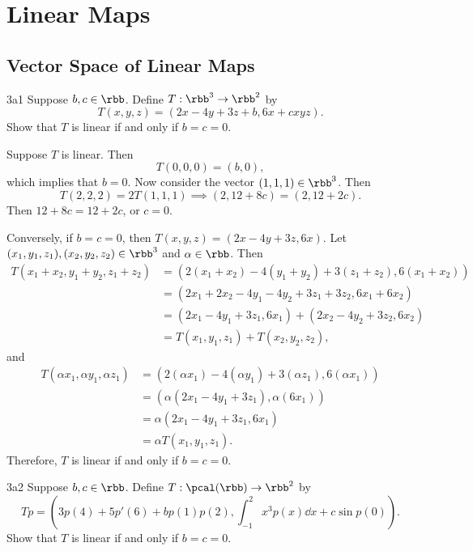 \section{Linear Maps}

\subsection{Vector Space of Linear Maps}

\begin{exercise}{3a1}
    Suppose $b, c \in \rbb$.
	Define $T: \rbb^3 \to \rbb^2$ by
    \[
    	T(x, y, z) = (2x - 4y + 3z + b, 6x + cxyz).
    \]
    Show that $T$ is linear if and only if $b = c = 0$.
\end{exercise}

\begin{sol}
    Suppose $T$ is linear.
	Then
    \[
    	T(0, 0, 0) = (b, 0),
    \]
    which implies that $b = 0$.
	Now consider the vector $(1, 1, 1) \in \rbb^3$.
	Then
    \[
    	T(2, 2, 2) = 2T(1, 1, 1) \implies (2, 12 + 8c) = (2, 12 + 2c).
    \]
    Then $12 + 8c = 12 + 2c$, or $c = 0$.

    Conversely, if $b = c = 0$, then $T(x, y, z) = (2x - 4y + 3z, 6x)$.
	Let $(x_1, y_1, z_1), (x_2, y_2, z_2) \in \rbb^3$ and $\alpha \in \rbb$.
	Then
    \begin{align*}
        T(x_1 + x_2, y_1 + y_2, z_1 + z_2) & = (2(x_1 + x_2) - 4(y_1 + y_2) + 3(z_1 + z_2), 6(x_1 + x_2)) \\
        & = (2x_1 + 2x_2 - 4y_1 - 4y_2 + 3z_1 + 3z_2, 6x_1 + 6x_2) \\
        & = (2x_1 - 4y_1 + 3z_1, 6x_1) + (2x_2 - 4y_2 + 3z_2, 6x_2) \\
        & = T(x_1, y_1, z_1) + T(x_2, y_2, z_2),
    \end{align*}
    and
    \begin{align*}
        T(\alpha x_1, \alpha y_1, \alpha z_1) & = (2(\alpha x_1) - 4(\alpha y_1) + 3(\alpha z_1), 6(\alpha x_1)) \\
        & = (\alpha(2x_1 - 4y_1 + 3z_1), \alpha(6x_1)) \\
        & = \alpha(2x_1 - 4y_1 + 3z_1, 6x_1) \\
        & = \alpha T(x_1, y_1, z_1).
    \end{align*}
    Therefore, $T$ is linear if and only if $b = c = 0$.
\end{sol}

\begin{exercise}{3a2}
    Suppose $b, c \in \rbb$.
	Define $T: \pcal(\rbb) \to \rbb^2$ by
    \[
    	Tp = \left(3p(4) + 5p'(6) + bp(1)p(2), \int_{-1}^{2} x^3 p(x) \dd x + c \sin p(0)\right).
    \]
    Show that $T$ is linear if and only if $b = c = 0$.
\end{exercise}

